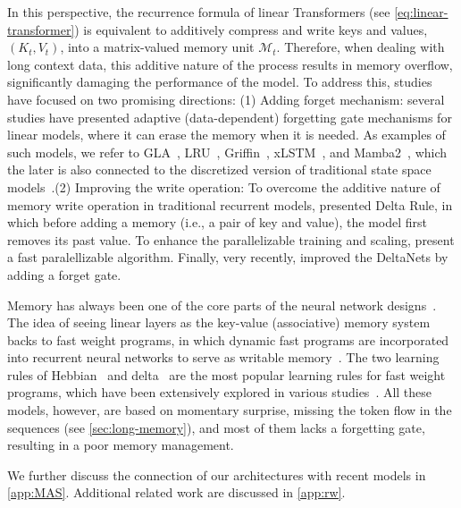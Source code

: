 \documentclass{article}
\newcommand{\citep}{\parencite}
\newcommand{\citet}{\textcite}
\newcommand{\M}[0]{\mathcal{M}}
\newcommand{\head}[1]{\vspace{1.7mm}\noindent{{\textcolor{c3}{\bf #1.}}}}
\begin{document}
In this perspective, the recurrence formula of linear Transformers (see \autoref{eq:linear-transformer}) is equivalent to additively compress and write keys and values, $(K_t, V_t)$, into a matrix-valued memory unit $\M_t$. Therefore, when dealing with long context data, this additive nature of the process results in memory overflow, significantly damaging the performance of the model. To address this, studies have focused on two promising directions: (1) Adding forget mechanism: several studies have presented adaptive (data-dependent) forgetting gate mechanisms for linear models, where it can erase the memory when it is needed. As examples of such models, we refer to GLA~\citep{yang2024gatedattn}, LRU~\citep{orvieto2023resurrecting}, Griffin~\citep{de2024griffin}, xLSTM~\citep{beck2024xlstm}, and Mamba2~\citep{dao2024transformers}, which the later is also connected to the discretized version of traditional state space models~\citep{gu2024mamba}.(2) Improving the write operation: To overcome the additive nature of memory write operation in traditional recurrent models, \citet{widrow1988adaptive} presented Delta Rule, in which before adding a memory (i.e., a pair of key and value), the model first removes its past value. To enhance the parallelizable training and scaling, \citet{yang2024parallelizing} present a fast paralellizable algorithm.  Finally, very recently, \citet{yang2024gated} improved the DeltaNets by adding a forget gate.   

\head{Memory Modules} Memory has always been one of the core parts of the neural network designs~\citep{schmidhuber1992learning, LSTM, graves2014neuralturingmachines, zhang2024memory}. The idea of seeing linear layers as the key-value (associative) memory system backs to fast weight programs, in which dynamic fast programs are incorporated into recurrent neural networks to serve as writable memory~\citep{schmidhuber1992learning}. The two learning rules of Hebbian~\citep{hebb2005organization} and delta~\citep{prados1989neural} are the most popular learning rules for fast weight programs, which have been extensively explored in various studies~\citep{munkhdalai2017neural, schmidhuber1992learning, munkhdalai2019metalearned, schlag2021linear, irie2021going, yang2024parallelizing, yang2024gated}. All these models, however, are based on momentary surprise, missing the token flow in the sequences (see \autoref{sec:long-memory}), and most of them lacks a forgetting gate, resulting in a poor memory management. 

We further discuss the connection of our architectures with recent models in \autoref{app:MAS}. Additional related work are discussed in \autoref{app:rw}.
\end{document}
